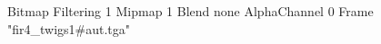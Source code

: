 {Bitmap
	{Filtering 1}
	{Mipmap 1}
	{Blend none}
	{AlphaChannel 0}
	{Frame "fir4_twigs1#aut.tga"}
}
